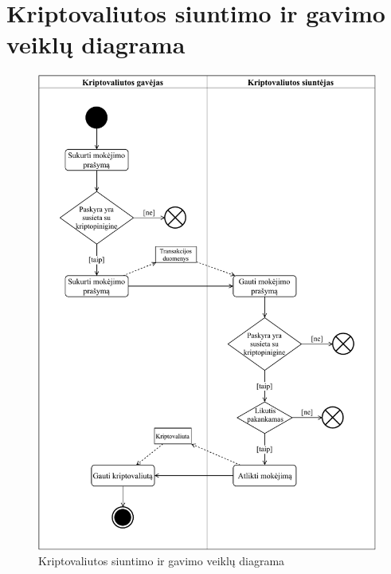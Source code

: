 \section{Kriptovaliutos siuntimo ir gavimo veiklų diagrama}
\begin{figure}[H]
    \centering
    \includegraphics[scale=0.9]{images/ad-3}
    \caption{Kriptovaliutos siuntimo ir gavimo veiklų diagrama}
\end{figure}

